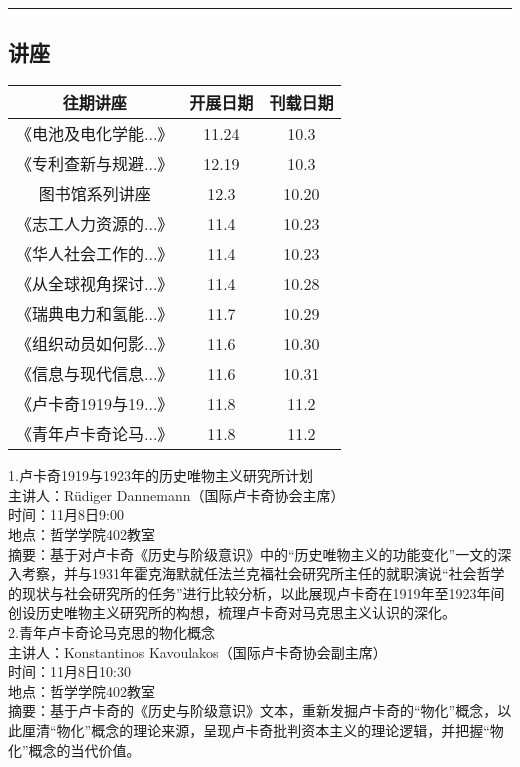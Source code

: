 \documentclass[letterpaper, 12pt]{article}
\begin{document}
\hrule
\pagebreak
\begin{multicols}{2}

\section{讲座}
\begin{tabular}{|c|c|c|}
    \hline
    往期讲座 & 开展日期 & 刊载日期\\
    \hline\hline
    《电池及电化学能...》 & 11.24 & 10.3\\
    《专利查新与规避...》 & 12.19 & 10.3\\
    图书馆系列讲座 & 12.3 & 10.20\\
    《志工人力资源的...》 & 11.4 & 10.23\\
    《华人社会工作的...》 & 11.4 & 10.23\\
    《从全球视角探讨...》 & 11.4 & 10.28\\
    《瑞典电力和氢能...》 & 11.7 & 10.29\\
    《组织动员如何影...》 & 11.6 & 10.30\\
    《信息与现代信息...》 & 11.6 & 10.31\\
    《卢卡奇1919与19...》 & 11.8 & 11.2\\
    《青年卢卡奇论马...》 & 11.8 & 11.2\\
    \hline
\end{tabular}

1.卢卡奇1919与1923年的历史唯物主义研究所计划\\
主讲人：Rüdiger Dannemann（国际卢卡奇协会主席）\\
时间：11月8日9:00\\
地点：哲学学院402教室\\
摘要：基于对卢卡奇《历史与阶级意识》中的“历史唯物主义的功能变化”一文的深入考察，并与1931年霍克海默就任法兰克福社会研究所主任的就职演说“社会哲学的现状与社会研究所的任务”进行比较分析，以此展现卢卡奇在1919年至1923年间创设历史唯物主义研究所的构想，梳理卢卡奇对马克思主义认识的深化。\\

2.青年卢卡奇论马克思的物化概念\\
主讲人：Konstantinos Kavoulakos（国际卢卡奇协会副主席）\\
时间：11月8日10:30\\
地点：哲学学院402教室\\
摘要：基于卢卡奇的《历史与阶级意识》文本，重新发掘卢卡奇的“物化”概念，以此厘清“物化”概念的理论来源，呈现卢卡奇批判资本主义的理论逻辑，并把握“物化”概念的当代价值。\\



\end{multicols}
\end{document}

